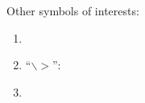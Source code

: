 Other symbols of interests: \vspace{-0.3cm}
\begin{enumerate} \itemsep -4pt
\item \officialeuro
\item ``$\backslash >$'': 
\item 
\end{enumerate}















